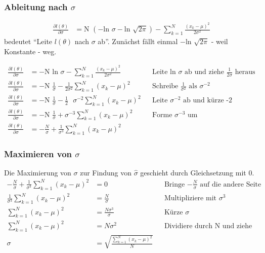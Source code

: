 \subsubsection*{Ableitung nach $\sigma$}
\begin{align*}
	\frac{\partial l(\theta)}{\partial \sigma} &= \text{N } (- \text{ln }\sigma - \text{ln }\sqrt{2\pi}) - \sum_{k=1}^N {\frac{(x_k-\mu)^2}{2\sigma^2}}
\end{align*} 
bedeutet ``Leite $l(\theta)$ nach $\sigma$ ab''. Zunächst fällt einmal $- \text{ln }\sqrt{2\pi}$ - weil Konstante - weg.

\begin{align*}
	\frac{\partial l(\theta)}{\partial \sigma} &= - \text{N ln }\sigma - \sum_{k=1}^N {\frac{(x_k-\mu)^2}{2\sigma^2}} && \text{Leite ln $\sigma$ ab und ziehe $\frac{1}{2\sigma}$ heraus}\\
	\frac{\partial l(\theta)}{\partial \sigma} &= - \text{N }\frac{1}{\sigma} - \frac{1}{2\sigma^2}\sum_{k=1}^N (x_k-\mu)^2 && \text{Schreibe $\frac{1}{\sigma^2}$ als $\sigma^{-2}$}\\
	\frac{\partial l(\theta)}{\partial \sigma} &= - \text{N }\frac{1}{\sigma} - \frac{1}{2}\text{ }\sigma^{-2}\sum_{k=1}^N (x_k-\mu)^2 && \text{Leite $\sigma^{-2}$ ab und kürze -2}\\
	\frac{\partial l(\theta)}{\partial \sigma} &= - \text{N }\frac{1}{\sigma} + \sigma^{-3}\sum_{k=1}^N (x_k-\mu)^2 && \text{Forme $\sigma^{-3}$ um}\\
	\frac{\partial l(\theta)}{\partial \sigma} &= - \frac{N}{\sigma} + \frac{1}{\sigma^3}\sum_{k=1}^N (x_k-\mu)^2
\end{align*}

\subsubsection*{Maximieren von $\sigma$}
Die Maximierung von $\sigma$ zur Findung von $\hat\sigma$ geschieht durch Gleichsetzung mit 0.
\begin{align*}
	- \frac{N}{\sigma} + \frac{1}{\sigma^3}\sum_{k=1}^N (x_k-\mu)^2 &= 0 && \text{Bringe $- \frac{N}{\sigma}$ auf die andere Seite}\\
	\frac{1}{\sigma^3}\sum_{k=1}^N (x_k-\mu)^2 &= \frac{N}{\sigma} && \text{Multipliziere mit $\sigma^3$}\\
	\sum_{k=1}^N (x_k-\mu)^2 &= \frac{N\sigma^3}{\sigma} && \text{Kürze $\sigma$}\\
	\sum_{k=1}^N (x_k-\mu)^2 &= N\sigma^2 && \text{Dividiere durch N und ziehe die Wurzel}\\
	\sigma &= \sqrt{\frac{\sum_{k=1}^N (x_k-\mu)^2}{N}}
\end{align*}